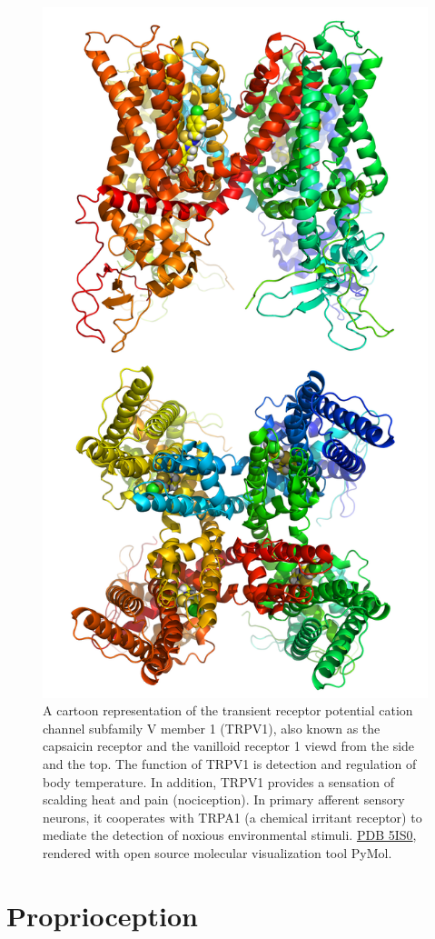 \begin{figure}

{\centering \includegraphics[width=0.7\linewidth]{./figures/somatosensory/TRPV1} 

}

\caption{A cartoon representation of the transient receptor potential cation channel subfamily V member 1 (TRPV1), also known as the capsaicin receptor and the vanilloid receptor 1 viewd from the side and the top. The function of TRPV1 is detection and regulation of body temperature. In addition, TRPV1 provides a sensation of scalding heat and pain (nociception). In primary afferent sensory neurons, it cooperates with TRPA1 (a chemical irritant receptor) to mediate the detection of noxious environmental stimuli. \href{https://www.rcsb.org/structure/5IS0}{PDB 5IS0}, rendered with open source molecular visualization tool PyMol.}\label{fig:TRPV1channel}
\end{figure}

\hypertarget{proprioception}{%
\section{Proprioception}\label{proprioception}}

